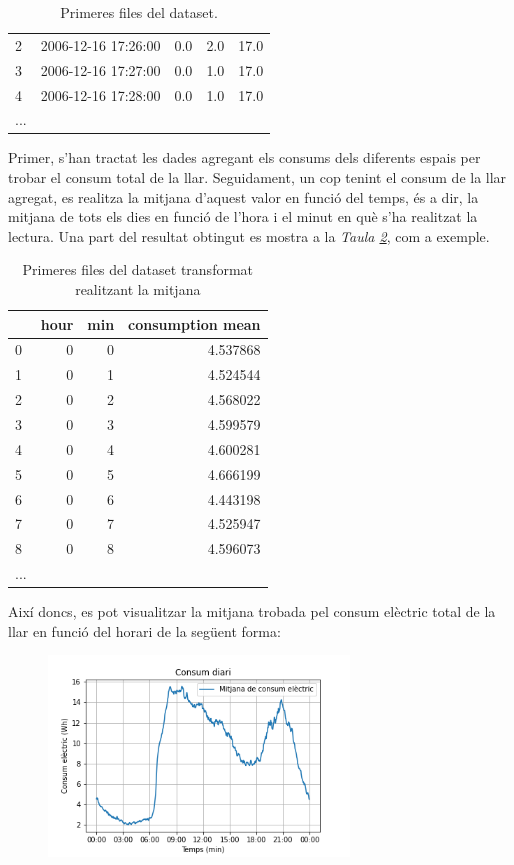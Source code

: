 \begin{itemize}
\begin{table}[H]
\begin{tabular}{llrrr}
				2 & 2006-12-16 17:26:00 &             0.0 &             2.0 &            17.0 \\
				3 & 2006-12-16 17:27:00 &             0.0 &             1.0 &            17.0 \\
				4 & 2006-12-16 17:28:00 &             0.0 &             1.0 &            17.0 \\
				...\\
				\bottomrule
			\end{tabular}
		\caption{Primeres files del dataset.}
		\label{tab:ex-kaggle}
	\end{table}
	Primer, s'han tractat les dades agregant els consums dels diferents espais per trobar el consum total de la llar. Seguidament, un cop tenint el consum de la llar agregat, es realitza la mitjana d'aquest valor en funció del temps, és a dir, la mitjana de tots els dies en funció de l'hora i el minut en què s'ha realitzat la lectura. Una part del resultat obtingut es mostra a la \textit{Taula \ref{tab:ex-kaggle-mean}}, com a exemple.
	\begin{table}[H]
		\centering
		\begin{tabular}{lrrr}
			\toprule
			{} & hour & min & consumption mean \\
			\midrule
			0 &    0 &   0 &    4.537868 \\
			1 &    0 &   1 &    4.524544 \\
			2 &    0 &   2 &    4.568022 \\
			3 &    0 &   3 &    4.599579 \\
			4 &    0 &   4 &    4.600281 \\
			5 &    0 &   5 &    4.666199 \\
			6 &    0 &   6 &    4.443198 \\
			7 &    0 &   7 &    4.525947 \\
			8 &    0 &   8 &    4.596073 \\
			...\\
			\bottomrule
		\end{tabular}
	\caption{Primeres files del dataset transformat realitzant la mitjana}
	\label{tab:ex-kaggle-mean}
	\end{table}
	   Així doncs, es pot visualitzar la mitjana trobada pel consum elèctric total de la llar en funció del horari de la següent forma:
\begin{figure}[H]
	\centering
	\includegraphics[width=8cm]{imgs/cost/consumptionmin.png}

\end{figure}
\end{itemize}

